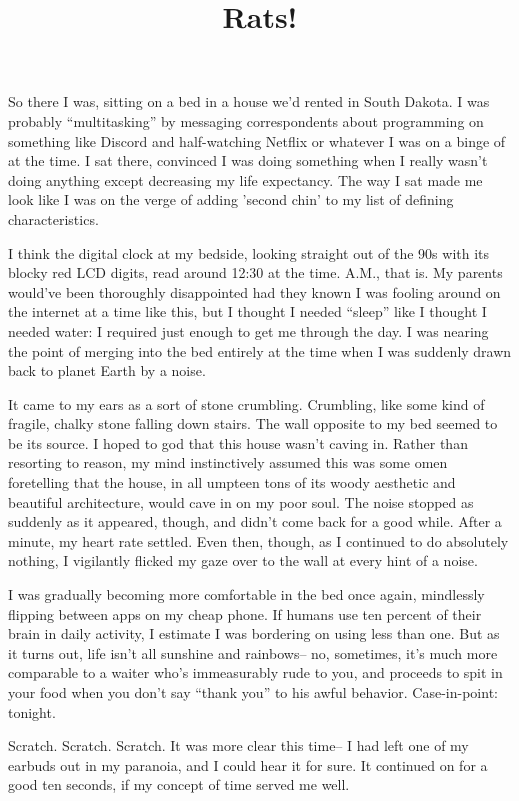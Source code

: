 \documentclass[12pt]{article}
\title{Rats!}
\begin{document}
\makeheader
\hspace{0.5in}
So there I was, sitting on a bed in a house we'd rented in South Dakota.  I was probably ``multitasking'' by messaging correspondents about programming on something like Discord and half-watching Netflix or whatever I was on a binge of at the time.  I sat there, convinced I was doing something when I really wasn't doing anything except decreasing my life expectancy.  The way I sat made me look like I was on the verge of adding 'second chin' to my list of defining characteristics.

I think the digital clock at my bedside, looking straight out of the 90s with its blocky red LCD digits, read around 12:30 at the time.  A.M., that is.  My parents would've been thoroughly disappointed had they known I was fooling around on the internet at a time like this, but I thought I needed ``sleep'' like I thought I needed water:  I required just enough to get me through the day.  I was nearing the point of merging into the bed entirely at the time when I was suddenly drawn back to planet Earth by a noise.

It came to my ears as a sort of stone crumbling.  Crumbling, like some kind of fragile, chalky stone falling down stairs.  The wall opposite to my bed seemed to be its source.  I hoped to god that this house wasn't caving in.  Rather than resorting to reason, my mind instinctively assumed this was some omen foretelling that the house, in all umpteen tons of its woody aesthetic and beautiful architecture, would cave in on my poor soul.  The noise stopped as suddenly as it appeared, though, and didn't come back for a good while.  After a minute, my heart rate settled.  Even then, though, as I continued to do absolutely nothing, I vigilantly flicked my gaze over to the wall at every hint of a noise.

I was gradually becoming more comfortable in the bed once again, mindlessly flipping between apps on my cheap phone.  If humans use ten percent of their brain in daily activity, I estimate I was bordering on using less than one.  But as it turns out, life isn't all sunshine and rainbows-- no, sometimes, it's much more comparable to a waiter who's immeasurably rude to you, and proceeds to spit in your food when you don't say ``thank you'' to his awful behavior.  Case-in-point:  tonight.

Scratch.  Scratch.  Scratch.  It was more clear this time-- I had left one of my earbuds out in my paranoia, and I could hear it for sure.  It continued on for a good ten seconds, if my concept of time served me well.
\end{document}
